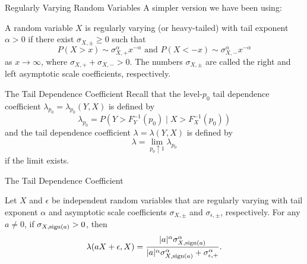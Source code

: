 \documentclass{beamer}
\def\sign{{\rm sign}}
\begin{document}
\begin{frame}{Regularly Varying Random Variables}
    A simpler version we have been using:
    \begin{definition}
        A random variable $X$ is regularly varying (or heavy-tailed) with tail exponent $\alpha > 0$ if there exist $\sigma_{X, \pm} \ge 0$ such that
        \begin{equation*}\label{eq:tail_conds}
            P(X > x) \sim \sigma_{X, +}^{\alpha}x^{-\alpha} \text{ and } P(X < -x) \sim \sigma_{X, -}^{\alpha}x^{-\alpha}
        \end{equation*}
        as $x \to \infty$, where $\sigma_{X, +} + \sigma_{X, -} > 0$. The numbers $\sigma_{X, \pm}$ are called the right and left asymptotic scale coefficients, respectively.
    \end{definition}
\end{frame}

    
        

\begin{frame}{The Tail Dependence Coefficient}
    Recall that the level-$p_0$ tail dependence coefficient $\lambda_{p_0} = \lambda_{p_0}(Y, X)$ is defined by
    \[
    \lambda_{p_0} = P(Y > F_Y^{-1}(p_0) \mid X > F_X^{-1}(p_0))
    \]
    and the tail dependence coefficient $\lambda = \lambda(Y, X)$ is defined by
    \[
    \lambda = \lim_{p_0 \uparrow 1} \lambda_{p_0}
    \]
    if the limit exists.
\end{frame}

\begin{frame}{The Tail Dependence Coefficient}
    \begin{lemma}\label{lem:lambda_lem}
        Let $X$ and $\epsilon$ be independent random variables that are regularly varying with tail exponent $\alpha$ and asymptotic scale coefficients $\sigma_{X, \pm}$ and $\sigma_{\epsilon, \pm}$, respectively. For any $a \ne 0$, if $\sigma_{X, \sign(a)} > 0$, then
        \[
        \lambda(a X + \epsilon, X) = \frac{|a|^\alpha \sigma_{X, \sign(a)}^\alpha}{|a|^\alpha \sigma_{X, \sign(a)}^\alpha + \sigma_{\epsilon, +}^\alpha}.
        \]
    \end{lemma}
\end{frame}
\end{document}
